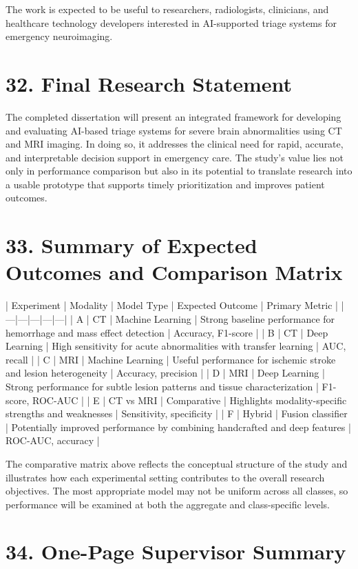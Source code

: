 \documentclass[12pt,a4paper]{report}
\begin{document}
The work is expected to be useful to researchers, radiologists, clinicians, and healthcare technology developers interested in AI-supported triage systems for emergency neuroimaging.


\section{32. Final Research Statement}

The completed dissertation will present an integrated framework for developing and evaluating AI-based triage systems for severe brain abnormalities using CT and MRI imaging. In doing so, it addresses the clinical need for rapid, accurate, and interpretable decision support in emergency care. The study’s value lies not only in performance comparison but also in its potential to translate research into a usable prototype that supports timely prioritization and improves patient outcomes.


\section{33. Summary of Expected Outcomes and Comparison Matrix}

| Experiment | Modality | Model Type | Expected Outcome | Primary Metric |
|---|---|---|---|---|
| A | CT | Machine Learning | Strong baseline performance for hemorrhage and mass effect detection | Accuracy, F1-score |
| B | CT | Deep Learning | High sensitivity for acute abnormalities with transfer learning | AUC, recall |
| C | MRI | Machine Learning | Useful performance for ischemic stroke and lesion heterogeneity | Accuracy, precision |
| D | MRI | Deep Learning | Strong performance for subtle lesion patterns and tissue characterization | F1-score, ROC-AUC |
| E | CT vs MRI | Comparative | Highlights modality-specific strengths and weaknesses | Sensitivity, specificity |
| F | Hybrid | Fusion classifier | Potentially improved performance by combining handcrafted and deep features | ROC-AUC, accuracy |

The comparative matrix above reflects the conceptual structure of the study and illustrates how each experimental setting contributes to the overall research objectives. The most appropriate model may not be uniform across all classes, so performance will be examined at both the aggregate and class-specific levels.


\section{34. One-Page Supervisor Summary}
\end{document}

